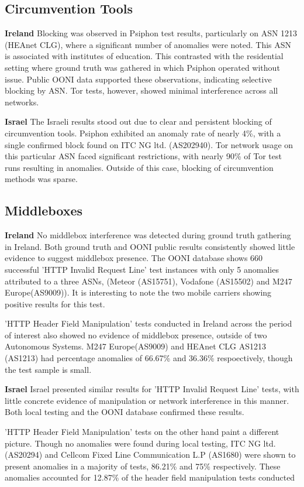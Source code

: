 \subsection{Circumvention Tools}
\large\textbf{Ireland}
Blocking was observed in Psiphon test results, particularly on ASN 1213 (HEAnet CLG), where a significant number of anomalies were noted. This ASN is associated with institutes of education. This contrasted with the residential setting where ground truth was gathered in which Psiphon operated without issue. Public OONI data supported these observations, indicating selective blocking by ASN. Tor tests, however, showed minimal interference across all networks.

\large\textbf{Israel}
The Israeli results stood out due to clear and persistent blocking of circumvention tools. Psiphon exhibited an anomaly rate of nearly 4\%, with a single confirmed block found on ITC NG ltd. (AS202940). Tor network usage on this particular ASN faced significant restrictions, with nearly 90\% of Tor test runs resulting in anomalies. Outside of this case, blocking of circumvention methods was sparse.

\subsection{Middleboxes}
\large\textbf{Ireland}
No middlebox interference was detected during ground truth gathering in Ireland. Both ground truth and OONI public results consistently showed  little evidence to suggest middlebox presence. The OONI database shows 660 successful 'HTTP Invalid Request Line' test instances with only 5 anomalies attributed to a three ASNs, (Meteor (AS15751), Vodafone (AS15502) and M247 Europe(AS9009)). It is interesting to note the two mobile carriers showing positive results for this test.

'HTTP Header Field Manipulation' tests conducted in Ireland across the period of interest also showed no evidence of middlebox presence, outside of two Autonomous Systems. M247 Europe(AS9009) and HEAnet CLG AS1213 (AS1213) had percentage anomalies of 66.67\% and 36.36\% respoectively, though the test sample is small.

\large\textbf{Israel}
Israel presented similar results for 'HTTP Invalid Request Line' tests, with little concrete evidence of manipulation or network interference in this manner. Both local testing and the OONI database confirmed these results.

'HTTP Header Field Manipulation' tests on the other hand paint a different picture. Though no anomalies were found during local testing, ITC NG ltd. (AS20294) and Cellcom Fixed Line Communication L.P (AS1680) were shown to present anomalies in a majority of tests, 86.21\% and 75\% respectively. These anomalies accounted for 12.87\% of the header field manipulation tests conducted

